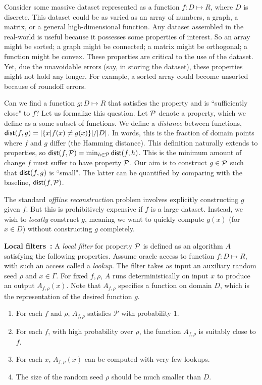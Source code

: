 \documentclass[natbib]{svcyclop}
\def\dist{{\sf dist}}
\begin{document}
\ProbDef

Consider some massive dataset represented as a function $f: D \mapsto R$,
where $D$ is discrete.
This dataset could be as varied as an array of numbers, a graph, a matrix, or a general high-dimensional function.
Any dataset assembled in the real-world is useful because it possesses some 
properties of interest. So an array might be sorted; a graph might be 
connected; a matrix might be orthogonal; a function might be convex. These properties are critical to the use
of the dataset. Yet, due the unavoidable errors (say, in storing the dataset), these
properties might not hold any longer. For example, a sorted array could become unsorted because of roundoff errors.

Can we find a function $g: D \mapsto R$ that satisfies the property and is ``sufficiently close"
to $f$? Let us formalize this question. Let $\mathcal{P}$ denote a property, which we define as a some subset
of functions. We define a \emph{distance} between functions, $\dist(f,g) = |\{x | f(x) \neq g(x)\}|/|D|$. In words, this is the fraction
of domain points where $f$ and $g$ differ (the Hamming distance). This definition naturally extends to properties,
so $\dist(f,\cP) = \min_{h \in \cP} \dist(f,h)$. This is the minimum amount of change $f$
must suffer to have property $\mathcal{P}$.
Our aim is to construct $g \in \mathcal{P}$ such that $\dist(f,g)$ is ``small". The latter can be quantified
by comparing with the baseline, $\dist(f,\cP)$.


The standard \emph{offline reconstruction} problem involves explicitly constructing $g$ given $f$.
But this is prohibitively expensive if $f$ is a large dataset. Instead, we wish to \emph{locally} construct $g$,
meaning we want to quickly compute $g(x)$ (for $x \in D$) without constructing $g$ completely.

{\bf Local filters~\cite{SS06}:} A {\em local filter} for property ${\cal P}$
is defined as an algorithm $A$ satisfying the following properties.
Assume oracle access to function $f:D \mapsto R$, with such an access called a \emph{lookup}.
The filter takes
as input an auxiliary random seed $\rho$ and $x \in \Gamma$.  
For fixed $f, \rho$, $A$ runs deterministically on input $x$ to produce an output $A_{f,\rho}(x)$.
Note that $A_{f,\rho}$ specifies a function on domain $D$, which is the representation of the desired function $g$.

\begin{enumerate}
\item \label{prop:1} For each $f$ and $\rho$,  $A_{f,\rho}$ 
satisfies $\mathcal{P}$ with probability $1$. 
\item \label{prop:2} For each $f$, with high probability over $\rho$, the function $A_{f,\rho}$ is suitably
close to $f$.
\item \label{prop:3} For each $x$, $A_{f,\rho}(x)$ can be computed with very few lookups.
\item \label{prop:4} The size of the random seed $\rho$ should be much smaller than $D$.
\end{enumerate}
\end{document}
